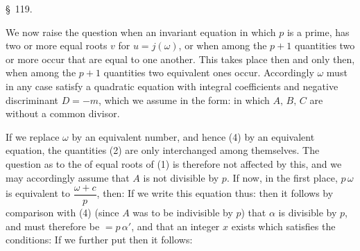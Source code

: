 
\S\ 119. 

We now raise the question when an invariant equation
in which $p$ is a prime, has two or more equal roots $v$ for $u = j(\omega)$, or when among the $p+1$ quantities
two or more occur that are equal to one another. This takes place then and only then, when among the $p+1$ quantities
two equivalent ones occur. Accordingly $\omega$ must in any case satisfy a quadratic equation with integral coefficients and negative discriminant $D=-m$, which we assume in the form:
in which $A,\,B,\,C$ are without a common divisor.

If we replace $\omega$ by an equivalent number, and hence (4) by an equivalent equation, the quantities (2) are only interchanged among themselves. The question as to the  of equal roots of (1) is therefore not affected by this, and we may accordingly assume that $A$ is not divisible by $p$. If now, in the first place, $p\,\omega$ is equivalent to $\dfrac{\omega+c}{p}$, then:
If we write this equation thus:
then it follows by comparison with (4) (since $A$ was to be indivisible by $p$) that $\alpha$ is divisible by $p$, and must therefore be $=p\,\alpha'$, and that an integer $x$ exists which satisfies the conditions:
If we further put
then it follows:
